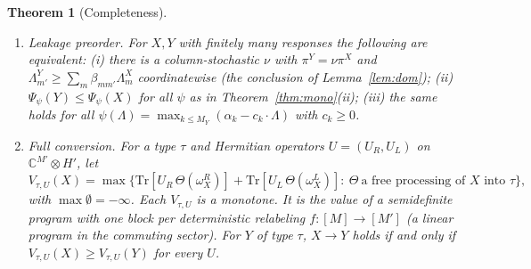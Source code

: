 \documentclass[11pt]{article}
\newtheorem{theorem}{Theorem}
\theoremstyle{definition}
\theoremstyle{remark}
\newcommand{\Tr}{\mathrm{Tr}}
\begin{document}
\begin{theorem}[Completeness]\label{thm:complete}
\leavevmode
\begin{enumerate}
\item[(a)] \emph{Leakage preorder.} For $X,Y$ with finitely many responses the following are equivalent:
(i) there is a column-stochastic $\nu$ with $\pi^Y=\nu\pi^X$ and $\Lambda^Y_{m'}\ge\sum_m\beta_{mm'}\Lambda^X_m$ coordinatewise (the conclusion of Lemma~\ref{lem:dom});
(ii) $\Psi_\psi(Y)\le\Psi_\psi(X)$ for all $\psi$ as in Theorem~\ref{thm:mono}(ii);
(iii) the same holds for all $\psi(\Lambda)=\max_{k\le M_Y}(\alpha_k-c_k\cdot\Lambda)$ with $c_k\ge0$.
\item[(b)] \emph{Full conversion.} For a type $\tau$ and Hermitian operators $U=(U_R,U_L)$ on $\mathbb C^{M'}\otimes H'$, let
\[
V_{\tau,U}(X)=\max\bigl\{\Tr[U_R\,\Theta(\omega^R_X)]+\Tr[U_L\,\Theta(\omega^L_X)]:\ \Theta\ \text{a free processing of $X$ into $\tau$}\bigr\},
\]
with $\max\emptyset=-\infty$. Each $V_{\tau,U}$ is a monotone. It is the value of a semidefinite program with one block per deterministic relabeling $f:[M]\to[M']$ (a linear program in the commuting sector). For $Y$ of type $\tau$, $X\to Y$ holds if and only if $V_{\tau,U}(X)\ge V_{\tau,U}(Y)$ for every $U$.
\end{enumerate}
\end{theorem}
\end{document}
